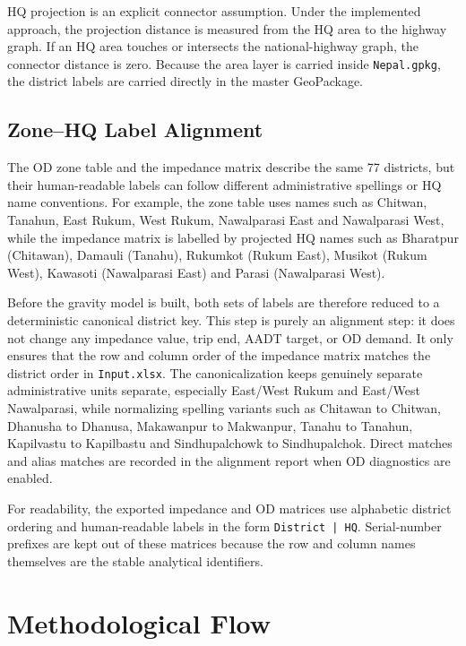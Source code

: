 \documentclass[11pt,a4paper]{article}
\begin{document}
HQ projection is an explicit connector assumption. Under the implemented approach,
the projection distance is measured from the HQ area to the highway graph. If an
HQ area touches or intersects the national-highway graph, the connector distance
is zero. Because the area layer is carried inside \texttt{Nepal.gpkg}, the
district labels are carried directly in the master GeoPackage.

\subsection{Zone--HQ Label Alignment}

The OD zone table and the impedance matrix describe the same 77 districts, but
their human-readable labels can follow different administrative spellings or HQ
name conventions. For example, the zone table uses names such as Chitwan,
Tanahun, East Rukum, West Rukum, Nawalparasi East and Nawalparasi West, while
the impedance matrix is labelled by projected HQ names such as Bharatpur
(Chitawan), Damauli (Tanahu), Rukumkot (Rukum East), Musikot (Rukum West),
Kawasoti (Nawalparasi East) and Parasi (Nawalparasi West).

Before the gravity model is built, both sets of labels are therefore reduced to
a deterministic canonical district key. This step is purely an alignment step:
it does not change any impedance value, trip end, AADT target, or OD demand. It
only ensures that the row and column order of the impedance matrix matches the
district order in \texttt{Input.xlsx}. The canonicalization keeps genuinely
separate administrative units separate, especially East/West Rukum and
East/West Nawalparasi, while normalizing spelling variants such as Chitawan to
Chitwan, Dhanusha to Dhanusa, Makawanpur to Makwanpur, Tanahu to Tanahun,
Kapilvastu to Kapilbastu and Sindhupalchowk to Sindhupalchok. Direct matches
and alias matches are recorded in the alignment report when OD diagnostics are
enabled.

For readability, the exported impedance and OD matrices use alphabetic
district ordering and human-readable labels in the form \texttt{District | HQ}.
Serial-number prefixes are kept out of these matrices because the row and
column names themselves are the stable analytical identifiers.

\section{Methodological Flow}
\end{document}
